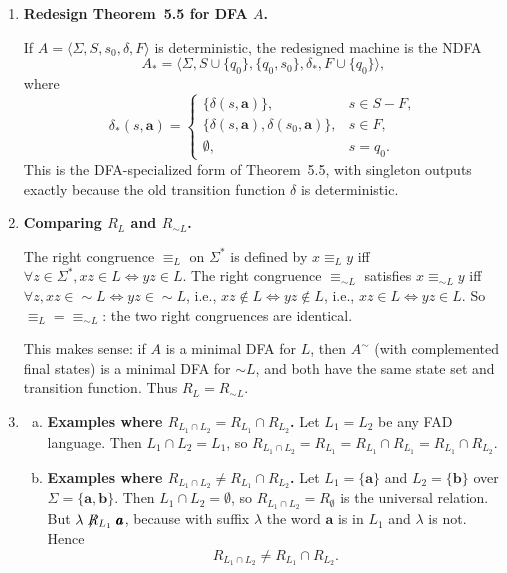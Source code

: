 \begin{enumerate}[{5.}1. ]
\item \textbf{Redesign Theorem~5.5 for DFA $A$.}

If $A=\langle\Sigma,S,s_0,\delta,F\rangle$ is deterministic, the redesigned
machine is the NDFA
\[
A_*=\langle\Sigma,S\cup\{q_0\},\{q_0,s_0\},\delta_*,F\cup\{q_0\}\rangle,
\]
where
\[
\delta_*(s,\pmb{a})=
\left\{
\begin{array}{ll}
\{\delta(s,\pmb{a})\}, & s\in S-F,\\
\{\delta(s,\pmb{a}),\delta(s_0,\pmb{a})\}, & s\in F,\\
\emptyset, & s=q_0.
\end{array}
\right.
\]
This is the DFA-specialized form of Theorem~5.5, with singleton outputs exactly
because the old transition function $\delta$ is deterministic.

\item \textbf{Comparing $R_L$ and $R_{\sim L}$.}

The right congruence $\equiv_L$ on $\Sigma^*$ is defined by $x\equiv_L y$ iff $\forall z\in\Sigma^*,xz\in L\Leftrightarrow yz\in L$.  The right congruence $\equiv_{\sim L}$ satisfies $x\equiv_{\sim L}y$ iff $\forall z,xz\in\sim L\Leftrightarrow yz\in\sim L$, i.e., $xz\notin L\Leftrightarrow yz\notin L$, i.e., $xz\in L\Leftrightarrow yz\in L$.  So $\equiv_L=\equiv_{\sim L}$: the two right congruences are identical.

This makes sense: if $A$ is a minimal DFA for $L$, then $A^\sim$ (with complemented final states) is a minimal DFA for $\sim L$, and both have the same state set and transition function.  Thus $R_L=R_{\sim L}$.

\item \begin{enumerate}[(a)]
  \item \textbf{Examples where $R_{L_1\cap L_2}=R_{L_1}\cap R_{L_2}$.}
  Let $L_1=L_2$ be any FAD language.  Then $L_1\cap L_2=L_1$, so $R_{L_1\cap L_2}=R_{L_1}=R_{L_1}\cap R_{L_1}=R_{L_1}\cap R_{L_2}$.

  \item \textbf{Examples where $R_{L_1\cap L_2}\neq R_{L_1}\cap R_{L_2}$.}
  Let $L_1=\{\pmb{a}\}$ and $L_2=\{\pmb{b}\}$ over $\Sigma=\{\pmb{a},\pmb{b}\}$.
  Then $L_1\cap L_2=\emptyset$, so $R_{L_1\cap L_2}=R_\emptyset$ is the
  universal relation.  But $\lambda\not\mathrel{R_{L_1}}\pmb{a}$, because with
  suffix $\lambda$ the word $\pmb{a}$ is in $L_1$ and $\lambda$ is not.  Hence
  \[
  R_{L_1\cap L_2}\neq R_{L_1}\cap R_{L_2}.
  \]
\end{enumerate}


\end{enumerate}
